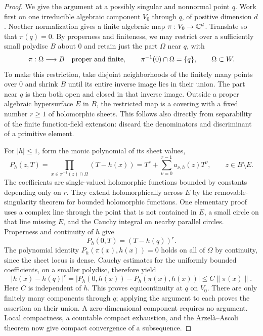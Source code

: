 \begin{proof}
We give the argument at a possibly singular and nonnormal point $q$.  Work
first on one irreducible algebraic component $V_0$ through $q$, of positive
dimension $d$.  Noether normalization
\cite[Lemma~10.115.4, Tag~00OY]{StacksNoether} gives a finite algebraic map
$\pi:V_0\to\mathbb C^d$.  Translate so that $\pi(q)=0$.  By properness and
finiteness, we may restrict over a sufficiently small polydisc $B$ about $0$
and retain just the part $\Omega$ near $q$, with
\[
  \pi:\Omega\longrightarrow B\quad\hbox{proper and finite},
  \qquad \pi^{-1}(0)\cap\Omega=\{q\},\qquad \Omega\subset W.
\]
To make this restriction, take disjoint neighborhoods of the finitely many
points over $0$ and shrink $B$ until its entire inverse image lies in their
union.  The part near $q$ is then both open and closed in that inverse image.
Outside a proper algebraic hypersurface $E$ in $B$, the restricted map is a
covering with a fixed number $r\geq1$ of holomorphic sheets.  This follows
also directly from separability of the finite function-field extension:
discard the denominators and discriminant of a primitive element.

For $|h|\leq1$, form the monic polynomial of its sheet values,
\[
  P_h(z,T)=\prod_{x\in\pi^{-1}(z)\cap\Omega}(T-h(x))
           =T^r+\sum_{\nu=0}^{r-1}a_{\nu,h}(z)T^\nu,
  \qquad z\in B\setminus E.
\]
The coefficients are single-valued holomorphic functions bounded by
constants depending only on $r$.  They extend holomorphically across $E$
by the removable-singularity theorem for bounded holomorphic functions.
One elementary proof uses a complex line through the point that is not
contained in $E$, a small circle on that line missing $E$, and the Cauchy
integral on nearby parallel circles.  Properness and continuity of $h$ give
\[
                         P_h(0,T)=(T-h(q))^r.
\]
The polynomial identity $P_h(\pi(x),h(x))=0$ holds on all of $\Omega$ by
continuity, since the sheet locus is dense.  Cauchy estimates for the
uniformly bounded coefficients, on a smaller polydisc, therefore yield
\[
  |h(x)-h(q)|^r
   =|P_h(0,h(x))-P_h(\pi(x),h(x))|
   \leq C\|\pi(x)\|.
\]
Here $C$ is independent of $h$.  This proves equicontinuity at $q$ on $V_0$.
There are only finitely many components through $q$; applying the argument
to each proves the assertion on their union.  A zero-dimensional component
requires no argument.  Local compactness, a countable compact exhaustion,
and the Arzel\`a--Ascoli theorem now give compact convergence of a subsequence.


\end{proof}
